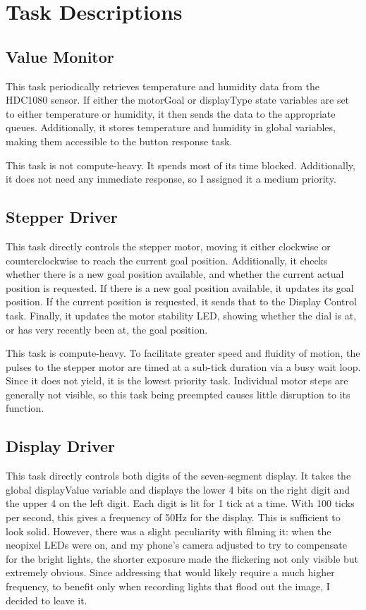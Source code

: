 \documentclass[12pt]{amsart}
\begin{document}
\section{Task Descriptions}

\subsection{Value Monitor}

This task periodically retrieves temperature and humidity data from the HDC1080 sensor.
If either the motorGoal or displayType state variables are set to either temperature or
humidity, it then sends the data to the appropriate queues. Additionally, it stores
temperature and humidity in global variables, making them accessible to the button response
task.

This task is not compute-heavy. It spends most of its time blocked. Additionally, it does not
need any immediate response, so I assigned it a medium priority.

\subsection{Stepper Driver}

This task directly controls the stepper motor, moving it either clockwise or counterclockwise
to reach the current goal position. Additionally, it checks whether there is a new goal position
available, and whether the current actual position is requested. If there is a new goal position
available, it updates its goal position. If the current position is requested, it sends that
to the Display Control task. Finally, it updates the motor stability LED, showing whether the
dial is at, or has very recently been at, the goal position.

This task is compute-heavy. To facilitate greater speed and fluidity of motion, the pulses to the
stepper motor are timed at a sub-tick duration via a busy wait loop. Since it does not yield, it is
the lowest priority task. Individual motor steps are generally not visible, so this task being
preempted causes little disruption to its function.

\subsection{Display Driver}

This task directly controls both digits of the seven-segment display. It takes the global displayValue
variable and displays the lower 4 bits on the right digit and the upper 4 on the left digit. Each
digit is lit for 1 tick at a time. With 100 ticks per second, this gives a frequency of 50Hz for the
display. This is sufficient to look solid. However, there was a slight peculiarity with filming it:
when the neopixel LEDs were on, and my phone's camera adjusted to try to compensate for the
bright lights, the shorter exposure made the flickering not only visible but extremely obvious.
Since addressing that would likely require a much higher frequency, to benefit only when recording
lights that flood out the image, I decided to leave it.
\end{document}
